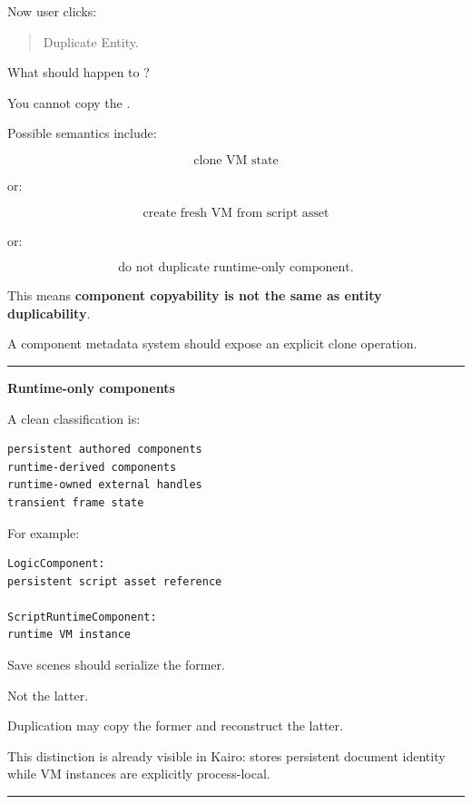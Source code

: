 Now user clicks:

\begin{quote}
Duplicate Entity.
\end{quote}

What should happen to ?

You cannot copy the .

Possible semantics include:

\[
\text{clone VM state}
\]

or:

\[
\text{create fresh VM from script asset}
\]

or:

\[
\text{do not duplicate runtime-only component}.
\]

This means \textbf{component copyability is not the same as entity duplicability}.

A component metadata system should expose an explicit clone operation.

\begin{center}\rule{0.5\linewidth}{0.5pt}\end{center}

\textbf{Runtime-only components}

A clean classification is:

\begin{verbatim}
persistent authored components
runtime-derived components
runtime-owned external handles
transient frame state
\end{verbatim}

For example:

\begin{verbatim}
LogicComponent:
persistent script asset reference

ScriptRuntimeComponent:
runtime VM instance
\end{verbatim}

Save scenes should serialize the former.

Not the latter.

Duplication may copy the former and reconstruct the latter.

This distinction is already visible in Kairo:  stores persistent document identity while VM instances are explicitly process-local.

\begin{center}\rule{0.5\linewidth}{0.5pt}\end{center}

